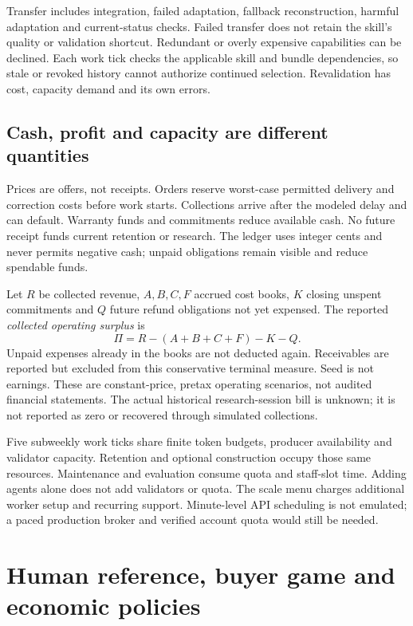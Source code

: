 \documentclass[11pt,letterpaper]{article}
\begin{document}
Transfer includes integration, failed adaptation, fallback reconstruction,
harmful adaptation and current-status checks. Failed transfer does not retain
the skill's quality or validation shortcut. Redundant or overly expensive
capabilities can be declined. Each work tick checks the applicable skill and
bundle dependencies, so stale or revoked history cannot authorize continued
selection. Revalidation has cost, capacity demand and its own errors.

\subsection{Cash, profit and capacity are different quantities}

Prices are offers, not receipts. Orders reserve worst-case permitted delivery
and correction costs before work starts. Collections arrive after the modeled
delay and can default. Warranty funds and commitments reduce available cash.
No future receipt funds current retention or research. The ledger uses integer
cents and never permits negative cash; unpaid obligations remain visible and
reduce spendable funds.

Let $R$ be collected revenue, $A,B,C,F$ accrued cost books, $K$ closing unspent
commitments and $Q$ future refund obligations not yet expensed. The reported
\emph{collected operating surplus} is
\begin{equation}
\Pi=R-(A+B+C+F)-K-Q.
\end{equation}
Unpaid expenses already in the books are not deducted again. Receivables are
reported but excluded from this conservative terminal measure. Seed is not
earnings. These are constant-price, pretax operating scenarios, not audited
financial statements. The actual historical research-session bill is unknown;
it is not reported as zero or recovered through simulated collections.

Five subweekly work ticks share finite token budgets, producer availability and
validator capacity. Retention and optional construction occupy those same
resources. Maintenance and evaluation consume quota and staff-slot time.
Adding agents alone does not add validators or quota. The scale menu charges
additional worker setup and recurring support. Minute-level API scheduling is
not emulated; a paced production broker and verified account quota would still
be needed.

\section{Human reference, buyer game and economic policies}
\end{document}
